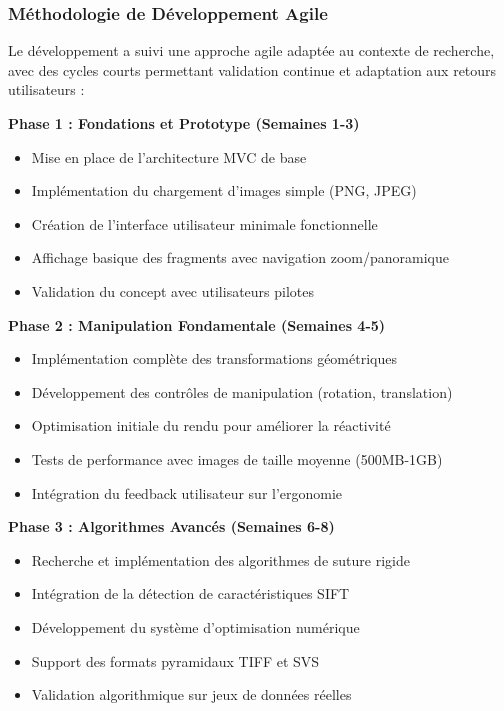 \documentclass[12pt,a4paper]{article}
\begin{document}
\subsubsection{Méthodologie de Développement Agile}

Le développement a suivi une approche agile adaptée au contexte de recherche, avec des cycles courts permettant validation continue et adaptation aux retours utilisateurs :

\textbf{Phase 1 : Fondations et Prototype (Semaines 1-3)}
\begin{itemize}
\item Mise en place de l'architecture MVC de base
\item Implémentation du chargement d'images simple (PNG, JPEG)
\item Création de l'interface utilisateur minimale fonctionnelle
\item Affichage basique des fragments avec navigation zoom/panoramique
\item Validation du concept avec utilisateurs pilotes
\end{itemize}

\textbf{Phase 2 : Manipulation Fondamentale (Semaines 4-5)}
\begin{itemize}
\item Implémentation complète des transformations géométriques
\item Développement des contrôles de manipulation (rotation, translation)
\item Optimisation initiale du rendu pour améliorer la réactivité
\item Tests de performance avec images de taille moyenne (500MB-1GB)
\item Intégration du feedback utilisateur sur l'ergonomie
\end{itemize}

\textbf{Phase 3 : Algorithmes Avancés (Semaines 6-8)}
\begin{itemize}
\item Recherche et implémentation des algorithmes de suture rigide
\item Intégration de la détection de caractéristiques SIFT
\item Développement du système d'optimisation numérique
\item Support des formats pyramidaux TIFF et SVS
\item Validation algorithmique sur jeux de données réelles
\end{itemize}
\end{document}
